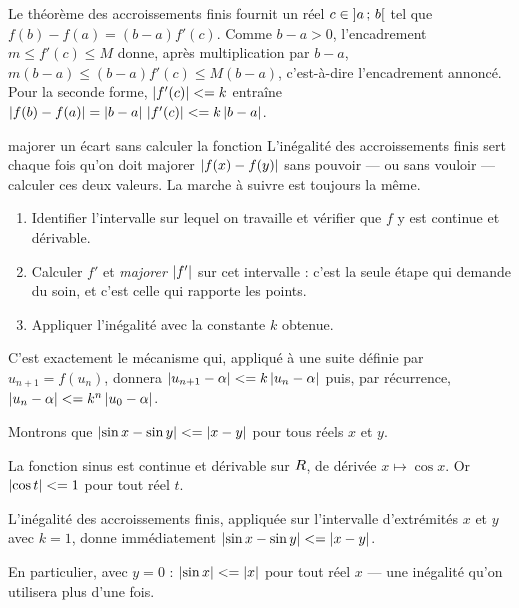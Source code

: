 \begin{demonstration}
Le théorème des accroissements finis fournit un réel
$c \in \left]a\,;\,b\right[$ tel que $f(b)-f(a) = (b-a)f'(c)$. Comme
$b-a > 0$, l'encadrement $m \leq f'(c) \leq M$ donne, après multiplication par
$b-a$,
$m(b-a) \leq (b-a)f'(c) \leq M(b-a)$, c'est-à-dire l'encadrement annoncé.
Pour la seconde forme, $\left|f'(c)\right| <= k$ entraîne
$\left|f(b)-f(a)\right| = \left|b-a\right|\,\left|f'(c)\right| <= k\left|b-a\right|$.
\end{demonstration}

\begin{methode}{majorer un écart sans calculer la fonction}
L'inégalité des accroissements finis sert chaque fois qu'on doit majorer
$\left|f(x)-f(y)\right|$ sans pouvoir — ou sans vouloir — calculer ces deux valeurs.
La marche à suivre est toujours la même.

\begin{enumerate}[label=\textbf{\arabic*.}, leftmargin=*, itemsep=0.3em]
  \item Identifier l'intervalle sur lequel on travaille et vérifier que $f$ y
        est continue et dérivable.
  \item Calculer $f'$ et \emph{majorer $\left|f'\right|$} sur cet intervalle : c'est
        la seule étape qui demande du soin, et c'est celle qui rapporte les
        points.
  \item Appliquer l'inégalité avec la constante $k$ obtenue.
\end{enumerate}

C'est exactement le mécanisme qui, appliqué à une suite définie par
$u_{n+1} = f(u_{n})$, donnera $\left|u_{n+1}-\alpha\right| <= k\left|u_{n}-\alpha\right|$
puis, par récurrence, $\left|u_{n}-\alpha\right| <= k^{n}\left|u_{0}-\alpha\right|$.
\end{methode}

\begin{exemple}
Montrons que $\left|\sin x - \sin y\right| <= \left|x-y\right|$ pour tous réels $x$ et $y$.

La fonction sinus est continue et dérivable sur $R$, de dérivée
$x \mapsto \cos x$. Or $\left|\cos t\right| <= 1$ pour tout réel $t$.

L'inégalité des accroissements finis, appliquée sur l'intervalle d'extrémités
$x$ et $y$ avec $k = 1$, donne immédiatement
$\left|\sin x - \sin y\right| <= \left|x-y\right|$.

\smallskip
En particulier, avec $y = 0$ : $\left|\sin x\right| <= \left|x\right|$ pour tout réel $x$
— une inégalité qu'on utilisera plus d'une fois.
\end{exemple}

